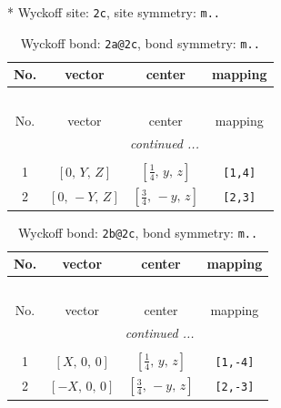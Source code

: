 \documentclass[fleqn,8pt]{jsarticle}
\begin{document}
* Wyckoff site: {\tt 2c}, site symmetry: {\tt m..}
\renewcommand{\arraystretch}{1.2}
\begin{longtable}{cccc}
\caption{Wyckoff bond: {\tt 2a@2c}, bond symmetry: {\tt m..}}
 \\
 \hline \hline
No. & vector & center & mapping \\ \hline \endfirsthead

\multicolumn{3}{l}{\tablename\ \thetable{}} \\
 \hline \hline
No. & vector & center & mapping \\ \hline \endhead

 \hline \hline
\multicolumn{3}{r}{\footnotesize\it continued ...} \\ \endfoot

 \hline \hline
\multicolumn{3}{r}{} \\ \endlastfoot

1 & $\left[ 0,\, Y,\, Z \right]$ & $\left[ \frac{1}{4},\, y,\, z \right]$ & {\tt [1,4]} \\ \hline
2 & $\left[ 0,\, - Y,\, Z \right]$ & $\left[ \frac{3}{4},\, - y,\, z \right]$ & {\tt [2,3]} \\
\end{longtable}
\renewcommand{\arraystretch}{1.2}
\begin{longtable}{cccc}
\caption{Wyckoff bond: {\tt 2b@2c}, bond symmetry: {\tt m..}}
 \\
 \hline \hline
No. & vector & center & mapping \\ \hline \endfirsthead

\multicolumn{3}{l}{\tablename\ \thetable{}} \\
 \hline \hline
No. & vector & center & mapping \\ \hline \endhead

 \hline \hline
\multicolumn{3}{r}{\footnotesize\it continued ...} \\ \endfoot

 \hline \hline
\multicolumn{3}{r}{} \\ \endlastfoot

1 & $\left[ X,\, 0,\, 0 \right]$ & $\left[ \frac{1}{4},\, y,\, z \right]$ & {\tt [1,-4]} \\ \hline
2 & $\left[ - X,\, 0,\, 0 \right]$ & $\left[ \frac{3}{4},\, - y,\, z \right]$ & {\tt [2,-3]} \\
\end{longtable}
\renewcommand{\arraystretch}{1.2}
\end{document}
